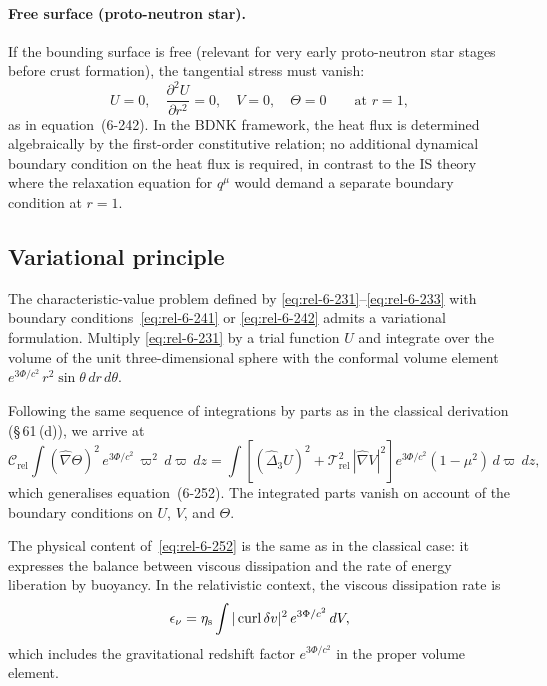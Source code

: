 \paragraph{Free surface (proto-neutron star).}
If the bounding surface is free (relevant for very early
proto-neutron star stages before crust formation), the tangential
stress must vanish:
\begin{equation}\label{eq:rel-6-242}
  U = 0,\quad
  \frac{\partial^{2}U}{\partial r^{2}} = 0,\quad
  V = 0,\quad
  \Theta = 0
  \qquad\text{at } r = 1,
\end{equation}
as in equation~(6-242).  In the BDNK framework, the heat flux is
determined algebraically by the first-order constitutive relation;
no additional dynamical boundary condition on the heat flux is
required, in contrast to the IS theory where the relaxation
equation for $q^{\mu}$ would demand a separate boundary condition
at $r = 1$.

\subsection{Variational principle}\label{sec:rel-61d}

The characteristic-value problem defined by
\eqref{eq:rel-6-231}--\eqref{eq:rel-6-233} with boundary
conditions~\eqref{eq:rel-6-241} or \eqref{eq:rel-6-242} admits a
variational formulation.  Multiply \eqref{eq:rel-6-231} by a trial
function $\hat{U}$ and integrate over the volume of the unit
three-dimensional sphere with the conformal volume element
$e^{3\Phi/c^{2}}\,r^{2}\sin\theta\,dr\,d\theta$.

Following the same sequence of integrations by parts as in the
classical derivation (\S\,61\,(d)), we arrive at
\begin{equation}\label{eq:rel-6-252}
  \mathcal{C}_{\mathrm{rel}}
  \int(\hat{\nabla}\Theta)^{2}\,
    e^{3\Phi/c^{2}}\,\varpi^{2}\,d\varpi\,dz
  = \int\!\left[
    (\hat{\Delta}_{3}U)^{2}
    + \mathscr{T}_{\mathrm{rel}}^{2}\,
      |\hat{\nabla}V|^{2}
  \right]
  e^{3\Phi/c^{2}}(1-\mu^{2})\,d\varpi\,dz,
\end{equation}
which generalises equation~(6-252).  The integrated parts vanish
on account of the boundary conditions on $U$, $V$, and $\Theta$.

The physical content of~\eqref{eq:rel-6-252} is the same as in the
classical case: it expresses the balance between viscous dissipation
and the rate of energy liberation by buoyancy.  In the relativistic
context, the viscous dissipation rate is
\begin{equation}\label{eq:rel-6-diss}
  \epsilon_{\nu}
  = \eta_{\mathrm{s}} \int
    |\operatorname{curl}\delta v|^{2}\,
    e^{3\Phi/c^{2}}\,dV,
\end{equation}
which includes the gravitational redshift factor
$e^{3\Phi/c^{2}}$ in the proper volume element.

